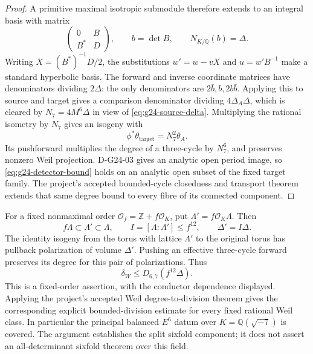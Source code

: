 \begin{proof}
A primitive maximal isotropic submodule therefore extends to an integral
basis with matrix
\[
                 \begin{pmatrix}0&B\\B^*&D\end{pmatrix},
 \qquad b=\det B,\qquad N_{K/\mathbb Q}(b)=\Delta.
\]
Writing \(X=(B^*)^{-1}D/2\), the substitutions \(w'=w-vX\) and
\(u=w'B^{-1}\) make a standard hyperbolic basis.  The forward and inverse
coordinate matrices have denominators dividing \(2\Delta\): the only
denominators are \(2\bar b,b,2b\bar b\).  Applying this to source and
target gives a comparison denominator dividing \(4\Delta_A\Delta\),
which is cleared by \(N_7=4M^6\Delta\) in view of
\eqref{eq:g24-source-delta}.  Multiplying the rational isometry by \(N_7\)
gives an isogeny with
\[
                  \phi^*\theta_{\mathrm{target}}=N_7^2\theta_A.
\]
Its pushforward multiplies the degree of a three-cycle by \(N_7^6\),
and preserves nonzero Weil projection.  D-G24-03 gives an analytic open
period image, so \eqref{eq:g24-detector-bound} holds on an analytic open
subset of the fixed target family.  The project's accepted bounded-cycle
closedness and transport theorem extends that same degree bound to every
fibre of its connected component.
\end{proof}

For a fixed nonmaximal order \(\mathcal O_f=\mathbb Z+f\mathcal O_K\),
put \(\Lambda'=f\mathcal O_K\Lambda\).  Then
\[
 f\Lambda\subset\Lambda'\subset\Lambda,\qquad
 I=[\Lambda:\Lambda']\le f^{12},\qquad \Delta'=I\Delta.
\]
The identity isogeny from the torus with lattice \(\Lambda'\) to the
original torus has pullback polarization of volume \(\Delta'\).  Pushing
an effective three-cycle forward preserves its degree for this pair of
polarizations.  Thus
\[
                     \boxed{\delta_W\le D_{6,7}(f^{12}\Delta).}
\]
This is a fixed-order assertion, with the conductor dependence displayed.
Applying the project's accepted Weil degree-to-division theorem gives the
corresponding explicit bounded-division estimate for every fixed rational
Weil class.  In particular the principal balanced \(E^6\) datum over
\(K=\mathbb Q(\sqrt{-7})\) is covered.  The argument establishes the
split sixfold component; it does not assert an all-determinant sixfold
theorem over this field.
